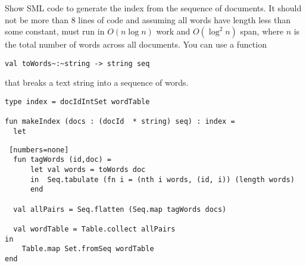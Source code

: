 \begin{problem}[8p]
\ask
Show SML code to generate the index from the sequence of documents.
It should not be more than 8 lines of code and assuming all words have
length less than some constant, must run in $O(n \log n)$ work and
$O(\log^2 n)$ span, where $n$ is the total number of words across all
documents.    You can use a function
\begin{lstlisting}
val toWords~:~string -> string seq
\end{lstlisting}
that breaks a text string into a sequence of words.

\begin{lstlisting}[numbers=none]
type index = docIdIntSet wordTable

fun makeIndex (docs : (docId  * string) seq) : index =
  let
\end{lstlisting}

\sol

\begin{lstlisting} [numbers=none]
  fun tagWords (id,doc) = 
      let val words = toWords doc
      in  Seq.tabulate (fn i = (nth i words, (id, i)) (length words) 
      end

  val allPairs = Seq.flatten (Seq.map tagWords docs)

  val wordTable = Table.collect allPairs
in
    Table.map Set.fromSeq wordTable
end
\end{lstlisting}
\end{problem}

